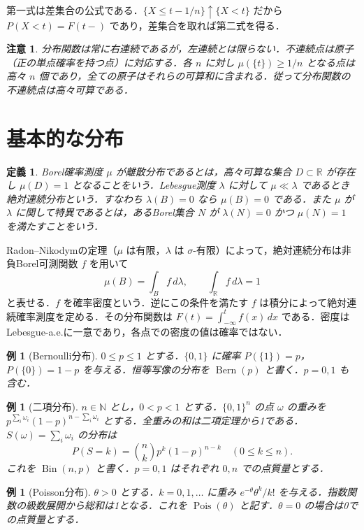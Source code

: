 \documentclass[a5paper,10pt,onecolumn]{jsarticle}
\makeatletter
\theoremstyle{mathnotetheorem}
\newtheorem{definition}[theorem]{定義}
\newtheorem{example}[theorem]{例}
\newtheorem{remark}[theorem]{注意}
\renewcommand{\proofname}{証明}
\renewenvironment{proof}[1][\proofname]{%
  \par\pushQED{\qed}\normalfont\topsep4\p@\@plus2\p@\relax
  \trivlist\item[\hskip\labelsep\bfseries #1]\ignorespaces
}{\popQED\endtrivlist\@endpefalse}
\newcommand{\R}{\mathbb{R}}
\newcommand{\N}{\mathbb{N}}
\newcommand{\1}{\mathbf{1}}
\makeatother
\begin{document}
\begin{proof}
第一式は差集合の公式である．$\{X\le t-1/n\}\uparrow\{X<t\}$ だから $P(X<t)=F(t-)$ であり，差集合を取れば第二式を得る．
\end{proof}
\begin{remark}
分布関数は常に右連続であるが，左連続とは限らない．不連続点は原子（正の単点確率を持つ点）に対応する．各 $n$ に対し $\mu(\{t\})\ge 1/n$ となる点は高々 $n$ 個であり，全ての原子はそれらの可算和に含まれる．従って分布関数の不連続点は高々可算である．
\end{remark}

\section{基本的な分布}
\begin{definition}
Borel確率測度 $\mu$ が離散分布であるとは，高々可算な集合 $D\subset\R$ が存在し $\mu(D)=1$ となることをいう．Lebesgue測度 $\lambda$ に対して $\mu\ll\lambda$ であるとき絶対連続分布という．すなわち $\lambda(B)=0$ なら $\mu(B)=0$ である．また $\mu$ が $\lambda$ に関して特異であるとは，あるBorel集合 $N$ が $\lambda(N)=0$ かつ $\mu(N)=1$ を満たすことをいう．
\end{definition}
Radon--Nikodymの定理（$\mu$ は有限，$\lambda$ は $\sigma$-有限）によって，絶対連続分布は非負Borel可測関数 $f$ を用いて
\[
 \mu(B)=\int_B f\,d\lambda,\qquad \int_\R f\,d\lambda=1
\]
と表せる．$f$ を確率密度という．逆にこの条件を満たす $f$ は積分によって絶対連続確率測度を定める．その分布関数は $F(t)=\int_{-\infty}^t f(x)\,dx$ である．密度はLebesgue-a.e.に一意であり，各点での密度の値は確率ではない．
\begin{example}[Bernoulli分布]
$0\le p\le1$ とする．$\{0,1\}$ に確率 $P(\{1\})=p$，$P(\{0\})=1-p$ を与える．恒等写像の分布を $\operatorname{Bern}(p)$ と書く．$p=0,1$ も含む．
\end{example}
\begin{example}[二項分布]
$n\in\N$ とし，$0<p<1$ とする．$\{0,1\}^n$ の点 $\omega$ の重みを $p^{\sum_i\omega_i}(1-p)^{n-\sum_i\omega_i}$ とする．全重みの和は二項定理から1である．$S(\omega)=\sum_i\omega_i$ の分布は
\[
 P(S=k)=\binom nk p^k(1-p)^{n-k}
 \quad(0\le k\le n).
\]
これを $\operatorname{Bin}(n,p)$ と書く．$p=0,1$ はそれぞれ $0,n$ での点質量とする．
\end{example}
\begin{example}[Poisson分布]
$\theta>0$ とする．$k=0,1,\ldots$ に重み $e^{-\theta}\theta^k/k!$ を与える．指数関数の級数展開から総和は1となる．これを $\operatorname{Pois}(\theta)$ と記す．$\theta=0$ の場合は0での点質量とする．
\end{example}
\end{document}
